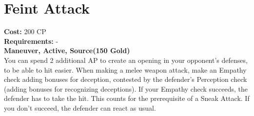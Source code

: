 \section{Feint Attack}
\textbf{Cost:} 200 CP\\
\textbf{Requirements:} -\\
\textbf{Maneuver, Active, Source(150 Gold)}\\
You can spend 2 additional AP to create an opening in your opponent’s defenses, to be able to hit easier. When making a melee weapon attack, make an Empathy check adding bonuses for deception, contested by the defender’s Perception check (adding bonuses for recognizing deceptions). If your Empathy check succeeds, the defender has to take the hit. This counts for the prerequisite of a Sneak Attack. If you don’t succeed, the defender can react as usual.\\